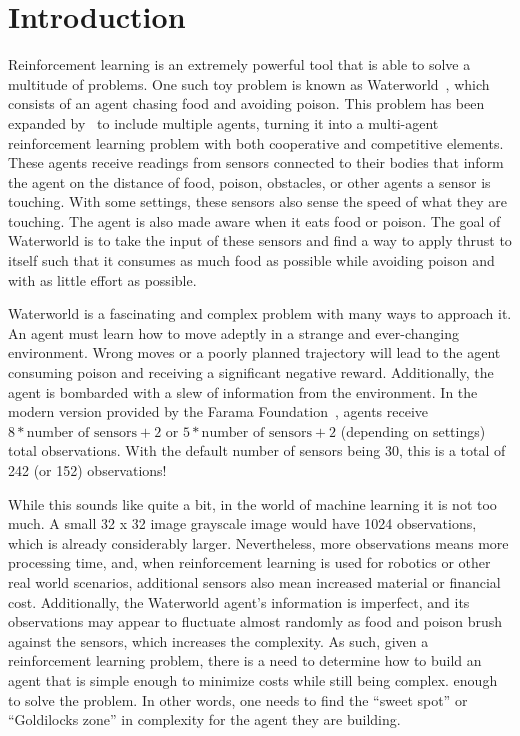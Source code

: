 \section{Introduction}\label{sec:introduction}
Reinforcement learning is an extremely powerful tool that is able to solve a multitude
of problems.
One such toy problem is known as Waterworld~\cite{Karpathy2015, Ho2016}, which consists
of an agent chasing food and avoiding poison.
This problem has been expanded by~\cite{Gupta2017} to include multiple agents,
turning it into a multi-agent reinforcement learning problem with both cooperative
and competitive elements.
These agents receive readings from sensors connected to their bodies that
inform the agent on the distance of food, poison, obstacles, or other agents a sensor
is touching.
With some settings, these sensors also sense the speed of what they are touching.
The agent is also made aware when it eats food or poison.
The goal of Waterworld is to take the input of these sensors and find a way to apply
thrust to itself such that it consumes as much food as possible while avoiding poison
and with as little effort as possible.

Waterworld is a fascinating and complex problem with many ways to approach it.
An agent must learn how to move adeptly in a strange and ever-changing environment.
Wrong moves or a poorly planned trajectory will lead to the agent consuming poison
and receiving a significant negative reward.
Additionally, the agent is bombarded with a slew of information from the environment.
In the modern version provided by the Farama Foundation~\cite{WaterworldDocumentation},
agents receive $8 * \text{number of sensors} + 2$ or
$5 * \text{number of sensors} + 2$ (depending on settings) total observations.
With the default number of sensors being 30, this is a total of 242 (or 152)
observations!

While this sounds like quite a bit, in the world of machine learning it is not too
much.
A small 32 x 32 image grayscale image would have 1024 observations, which is already
considerably larger.
Nevertheless, more observations means more processing time, and, when reinforcement
learning is used for robotics or other real world scenarios, additional sensors also
mean increased material or financial cost.
Additionally, the Waterworld agent's information is imperfect, and its observations
may appear to fluctuate almost randomly as food and poison brush against the sensors,
which increases the complexity.
As such, given a reinforcement learning problem, there is a need to determine how to
build an agent that is simple enough to minimize costs while still being complex.
enough to solve the problem.
In other words, one needs to find the ``sweet spot'' or ``Goldilocks zone'' in
complexity for the agent they are building.
